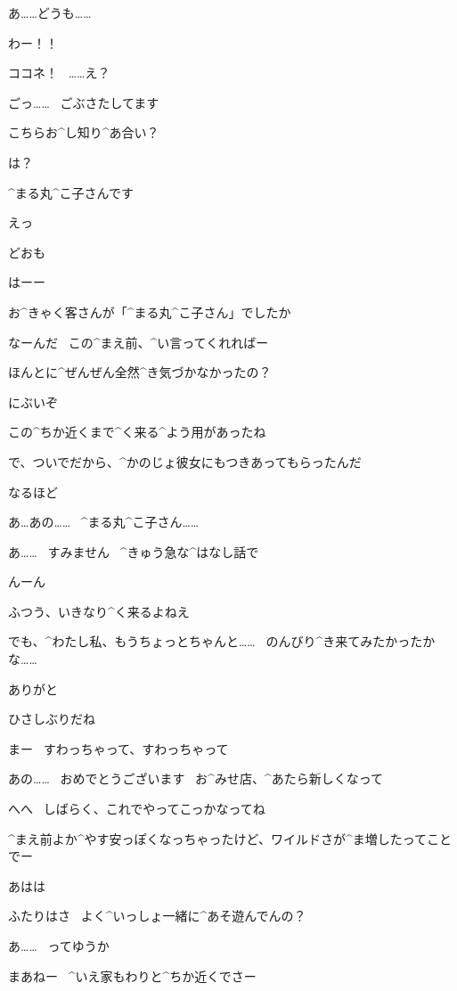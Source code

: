 \page
\Kokone あ……どうも……

\Alpha わー！！

\Alpha ココネ！
\ ……え？

\Kokone ごっ……
\ ごぶさたしてます

\Alpha こちらお^{し}{知}り^{あ}{合}い？

\Kokone は？

\Kokone ^{まる}{丸}^{こ}{子}さんです

\Alpha えっ

\page
\Maruko どおも

\Alpha はーー

\Alpha お^{きゃく}{客}さんが「^{まる}{丸}^{こ}{子}さん」でしたか

\Alpha なーんだ
\ この^{まえ}{前}、^{い}{言}ってくれればー

\Maruko ほんとに^{ぜんぜん}{全然}^{き}{気}づかなかったの？

\Maruko にぶいぞ

\page
\Maruko この^{ちか}{近}くまで^{く}{来}る^{よう}{用}があったね

\Maruko で、ついでだから、^{かのじょ}{彼女}にもつきあってもらったんだ

\Alpha なるほど

\Kokone あ…あの……
\ ^{まる}{丸}^{こ}{子}さん……

\Kokone あ……
\ すみません
\ ^{きゅう}{急}な^{はなし}{話}で

\Alpha んーん

\page
\Maruko ふつう、いきなり^{く}{来}るよねえ

\Kokone でも、^{わたし}{私}、もうちょっとちゃんと……
\ のんびり^{き}{来}てみたかったかな……

\Alpha ありがと

\Alpha ひさしぶりだね

\Alpha まー
\ すわっちゃって、すわっちゃって

\page
\Kokone あの……
\ おめでとうございます
\ お^{みせ}{店}、^{あたら}{新}しくなって

\Alpha へへ
\ しばらく、これでやってこっかなってね

\Alpha ^{まえ}{前}よか^{やす}{安}っぽくなっちゃったけど、ワイルドさが^{ま}{増}したってことでー

\Kokone あはは

\page
\Alpha ふたりはさ
\ よく^{いっしょ}{一緒}に^{あそ}{遊}んでんの？

\Kokone あ……
\ ってゆうか

\Maruko まあねー
\ ^{いえ}{家}もわりと^{ちか}{近}くでさー

